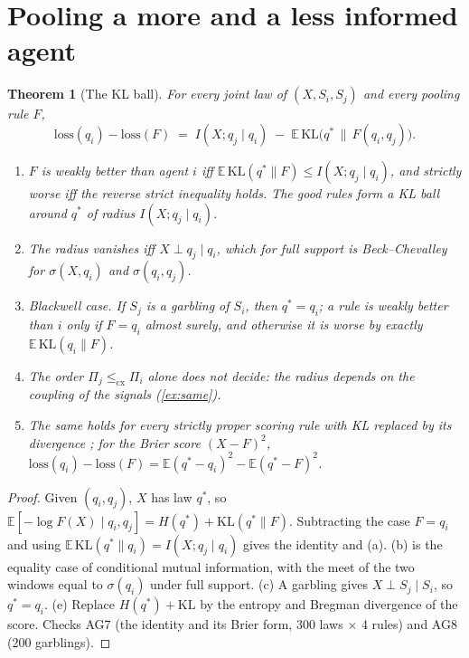 \documentclass[11pt]{article}
\newtheorem{theorem}{Theorem}
\theoremstyle{definition}
\theoremstyle{remark}
\newcommand{\EE}{\mathbb E}
\newcommand{\cx}{\le_{\mathrm{cx}}}
\newcommand{\KL}{\mathrm{KL}}
\begin{document}
\section{Pooling a more and a less informed agent}
\begin{theorem}[The KL ball]\label{thm:ball}
For every joint law of $(X,S_i,S_j)$ and every pooling rule $F$,
\[
\mathrm{loss}(q_i)-\mathrm{loss}(F)\;=\;I(X;q_j\mid q_i)\;-\;\EE\,\KL\bigl(q^*\,\big\|\,F(q_i,q_j)\bigr).
\]
\begin{enumerate}[label=(\alph*)]
\item $F$ is weakly better than agent $i$ iff $\EE\,\KL(q^*\|F)\le I(X;q_j\mid q_i)$, and strictly worse iff the reverse strict inequality
  holds. The good rules form a KL ball around $q^*$ of radius $I(X;q_j\mid q_i)$.
\item The radius vanishes iff $X\perp q_j\mid q_i$, which for full support is Beck--Chevalley for $\sigma(X,q_i)$ and $\sigma(q_i,q_j)$.
\item \emph{Blackwell case.} If $S_j$ is a garbling of $S_i$, then $q^*=q_i$; a rule is weakly better than $i$ only if $F=q_i$ almost
  surely, and otherwise it is worse by exactly $\EE\,\KL(q_i\|F)$.
\item The order $\Pi_j\cx\Pi_i$ alone does not decide: the radius depends on the coupling of the signals (\cref{ex:same}).
\item The same holds for every strictly proper scoring rule with KL replaced by its divergence \cite{GneitingRaftery2007}; for the Brier
  score $(X-F)^2$, $\mathrm{loss}(q_i)-\mathrm{loss}(F)=\EE(q^*-q_i)^2-\EE(q^*-F)^2$.
\end{enumerate}
\end{theorem}
\begin{proof}
Given $(q_i,q_j)$, $X$ has law $q^*$, so $\EE[-\log F(X)\mid q_i,q_j]=H(q^*)+\KL(q^*\|F)$. Subtracting the case $F=q_i$ and using
$\EE\,\KL(q^*\|q_i)=I(X;q_j\mid q_i)$ gives the identity and (a). (b) is the equality case of conditional mutual information, with the
meet of the two windows equal to $\sigma(q_i)$ under full support. (c) A garbling gives $X\perp S_j\mid S_i$, so $q^*=q_i$. (e) Replace
$H(q^*)+\KL$ by the entropy and Bregman divergence of the score. Checks AG7 (the identity and its Brier form, 300 laws $\times$ 4 rules)
and AG8 (200 garblings).
\end{proof}
\end{document}
